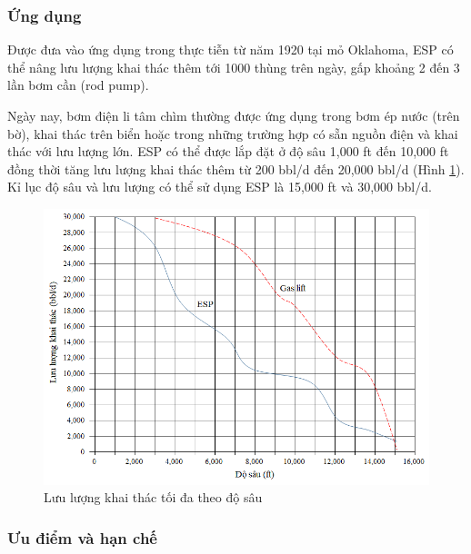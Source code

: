 \documentclass[12pt,a4paper]{report}
\begin{document}
\subsubsection{Ứng dụng}
Được đưa vào ứng dụng trong thực tiễn từ năm 1920 tại mỏ Oklahoma, ESP có thể nâng lưu lượng khai thác thêm tới 1000 thùng trên ngày, gấp khoảng 2 đến 3 lần bơm cần (rod pump).

Ngày nay, bơm điện li tâm chìm thường được ứng dụng trong bơm ép nước (trên bờ), khai thác trên biển hoặc trong những trường hợp có sẵn nguồn điện và khai thác với lưu lượng lớn. ESP có thể được lắp đặt ở độ sâu 1,000 ft đến 10,000 ft đồng thời tăng lưu lượng khai thác thêm từ 200 bbl/d đến 20,000 bbl/d (Hình \ref{fig:rate-vs-depth}). Kỉ lục độ sâu và lưu lượng có thể sử dụng ESP là 15,000 ft và 30,000 bbl/d.\\

	\begin{figure}[h]
		\centering
		\includegraphics[scale=0.6]{fig/rate-vs-depth.png}
		\caption{Lưu lượng khai thác tối đa theo độ sâu}
		\label{fig:rate-vs-depth}
	\end{figure}

\subsubsection{Ưu điểm và hạn chế}
\end{document}
